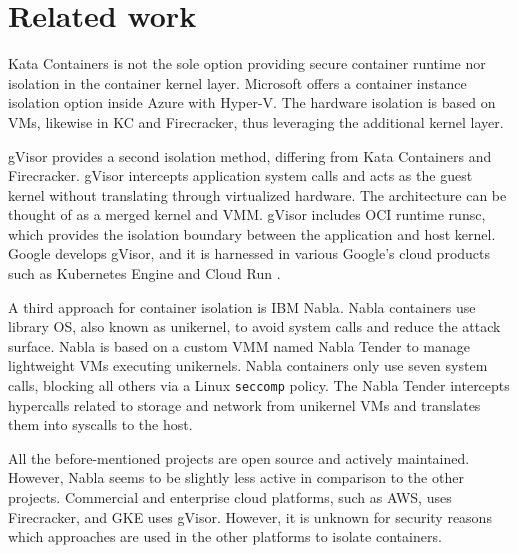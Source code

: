 \section{Related work}

Kata Containers is not the sole option providing secure container runtime nor isolation in the container kernel layer. Microsoft offers a container instance isolation option inside Azure with Hyper-V. The hardware isolation is based on VMs, likewise in KC and Firecracker, thus leveraging the additional kernel layer. \cite{Hyper-V}

gVisor provides a second isolation method, differing from Kata Containers and Firecracker. gVisor intercepts application system calls and acts as the guest kernel without translating through virtualized hardware. The architecture can be thought of as a merged kernel and VMM. gVisor includes OCI runtime runsc, which provides the isolation boundary between the application and host kernel. Google develops gVisor, and it is harnessed in various Google's cloud products such as Kubernetes Engine \cite{GKE} and Cloud Run \cite{CloudRun}. \cite{Debab2021}\cite{gVisor}

A third approach for container isolation is IBM Nabla\cite{Nabla}. Nabla containers use library OS, also known as unikernel, to avoid system calls and reduce the attack surface. Nabla is based on a custom VMM named Nabla Tender to manage lightweight VMs executing unikernels. Nabla containers only use seven system calls, blocking all others via a Linux \texttt{seccomp} policy. The Nabla Tender intercepts hypercalls related to storage and network from unikernel VMs and translates them into syscalls to the host. \cite{Debab2021}

All the before-mentioned projects are open source and actively maintained. However, Nabla seems to be slightly less active in comparison to the other projects. Commercial and enterprise cloud platforms, such as AWS, uses Firecracker, and GKE uses gVisor. However, it is unknown for security reasons which approaches are used in the other platforms to isolate containers.



